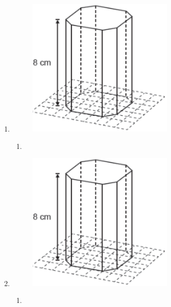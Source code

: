 \documentclass[twocolumn,oneside,a4paper,12.0pt]{article}
\begin{document}
\begin{enumerate}

\item 

	\begin{figure}[!htb]
	\center
	\includegraphics[width=7cm]{Extras/v3.png}
	\end{figure}


\begin{enumerate}
\item 
\end{enumerate}




\item 

	\begin{figure}[!htb]
	\center
	\includegraphics[width=7cm]{Extras/v3.png}
	\end{figure}


\begin{enumerate}
\item 
\end{enumerate}





\end{enumerate}
\end{document}
